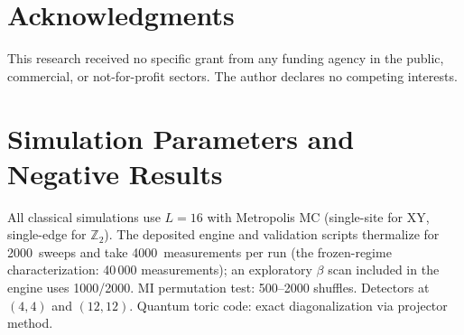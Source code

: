 \documentclass[aps,pra,twocolumn,superscriptaddress,showpacs,floatfix]{revtex4-2}
\newcommand{\Ztwo}{\mathbb{Z}_2}
\begin{document}
\section*{Acknowledgments}
This research received no specific grant from any funding agency in the public,
commercial, or not-for-profit sectors. The author declares no competing
interests.

\clearpage
\onecolumngrid

\appendix
\section{Simulation Parameters and Negative Results}

All classical simulations use $L = 16$ with Metropolis MC (single-site for XY,
single-edge for $\Ztwo$). The deposited engine and validation scripts thermalize
for 2000~sweeps and take 4000~measurements per run (the frozen-regime
characterization: 40\,000 measurements); an exploratory $\beta$ scan included in
the engine uses 1000/2000.
MI permutation test: 500--2000 shuffles. Detectors at $(4,4)$ and $(12,12)$.
Quantum toric code: exact diagonalization via projector method.
\end{document}
